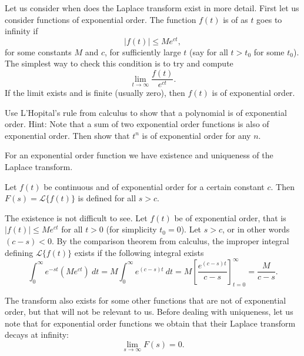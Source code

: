 Let us consider when does the Laplace transform exist in more detail.  First
let us consider functions of exponential order.  The function $f(t)$ is of
\emph{} as $t$ goes to infinity if
\begin{equation*}
\lvert f(t) \rvert \leq M e^{ct} ,
\end{equation*}
for some constants $M$ and $c$, for
sufficiently large $t$ (say for all $t > t_0$ for some $t_0$).  The simplest
way to check this condition is to try and compute
\begin{equation*}
\lim_{t\to \infty} \frac{f(t)}{e^{ct}} .
\end{equation*}
If the limit exists and is finite (usually zero), then $f(t)$ is of
exponential order.

\begin{exercise}
Use L'Hopital's rule from calculus to show that a polynomial is of
exponential order.  Hint: Note that a sum of two exponential order functions
is also of exponential order.  Then show that $t^n$ is of exponential order
for any $n$.
\end{exercise}

For an exponential order function we have existence and uniqueness of the
Laplace transform.

\begin{theorem}[Existence]
Let $f(t)$ be continuous and of exponential order for a certain
constant $c$.  Then $F(s) = \mathcal{L} \{ f(t) \}$ is defined for
all $s > c$.
\end{theorem}

The existence is not difficult to see.  Let $f(t)$ be of exponential order,
that is $\lvert f(t) \rvert \leq M e^{ct}$ for all $t > 0$ (for simplicity $t_0 = 0$).
Let $s > c$, or in other words $(c-s) < 0$.
By the comparison theorem from calculus, the improper integral defining
$\mathcal{L} \{ f(t) \}$ exists if the following integral exists
\begin{equation*}
\int_0^\infty e^{-st} ( M e^{ct} ) ~dt
=
M \int_0^\infty e^{(c-s)t} ~dt = M \left[ \frac{e^{(c-s)t}}{c-s}
\right]_{t=0}^\infty = \frac{M}{c-s} .
\end{equation*}

The transform also exists for some other functions
that are not of exponential
order, but that will not be relevant to us.
Before dealing with uniqueness, let
us note that for exponential order functions we obtain that their
Laplace transform decays at infinity:
\begin{equation*}
\lim_{s\to\infty} F(s) = 0 .
\end{equation*}

